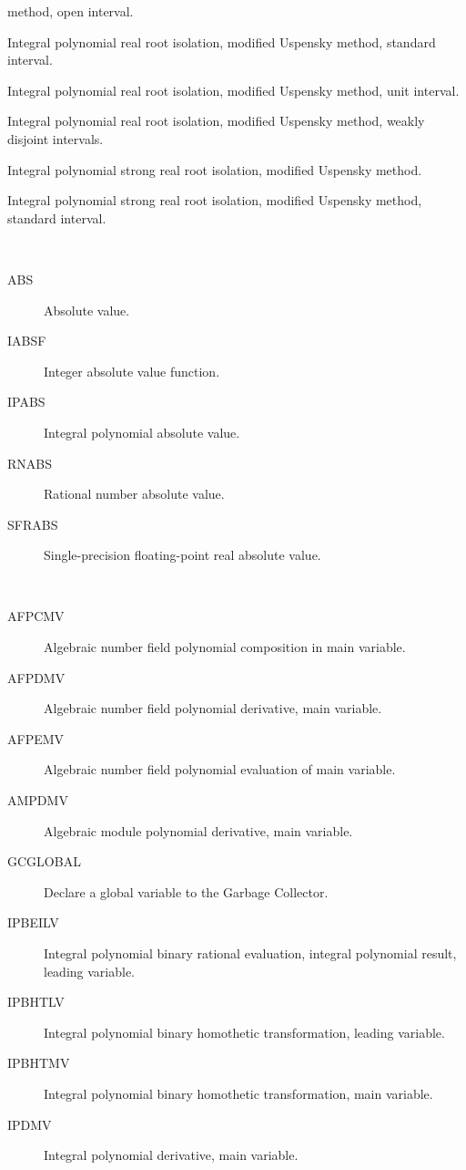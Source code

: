 \begin{description}
\begin{description}
    method, open interval.
  \item[IPRIMS]  Integral polynomial real root isolation, modified Uspensky
    method, standard interval.
  \item[IPRIMU]  Integral polynomial real root isolation, modified Uspensky
    method, unit interval.
  \item[IPRIMW]  Integral polynomial real root isolation, modified Uspensky
    method, weakly disjoint intervals.
  \item[IPSRM]  Integral polynomial strong real root isolation, modified
    Uspensky method.
  \item[IPSRMS]  Integral polynomial strong real root isolation, modified
    Uspensky method, standard interval.
  \end{description}
\item[value] \ \ 
  \begin{description}
  \item[ABS]  Absolute value.
  \item[IABSF]  Integer absolute value function.
  \item[IPABS]  Integral polynomial absolute value.
  \item[RNABS]  Rational number absolute value.
  \item[SFRABS]  Single-precision floating-point real absolute value.
  \end{description}
\item[variable] \ \ 
  \begin{description}
  \item[AFPCMV]  Algebraic number field polynomial composition in main
    variable.
  \item[AFPDMV]  Algebraic number field polynomial derivative, main variable.
  \item[AFPEMV]  Algebraic number field polynomial evaluation of main
    variable.
  \item[AMPDMV]  Algebraic module polynomial derivative, main variable.
  \item[GCGLOBAL]  Declare a global variable to the Garbage Collector.
  \item[IPBEILV]  Integral polynomial binary rational evaluation, integral
    polynomial result, leading variable.
  \item[IPBHTLV]  Integral polynomial binary homothetic transformation,
    leading variable.
  \item[IPBHTMV]  Integral polynomial binary homothetic transformation, main
    variable.
  \item[IPDMV]  Integral polynomial derivative, main variable.

\end{description}
\end{description}
